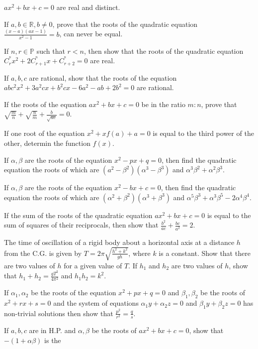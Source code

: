   $ax^2 + bx + c = 0$ are real and distinct.
\item If $a, b\in\mathbb{R}, b\neq 0$, prove that the roots of the quadratic equation $\frac{(x - a)(ax - 1)}{x^2 - 1} = b$, can
  never be equal.
\item If $n, r\in\mathbb{P}$ such that $r < n$, then show that the roots of the quadratic equation $C_r^^nx^2 + 2C_{r + 1}^^nx +
  C_{r + 2}^^n = 0$ are real.
\item If $a, b, c$ are rational, show that the roots of the equation $abc^2x^2 + 3a^2cx + b^2cx - 6a^2 - ab + 2b^2 = 0$ are
  rational.
\item If the roots of the equation $ax^2 + bx + c = 0$ be in the ratio $m:n$, prove that $\sqrt{\frac{m}{n}} + \sqrt{\frac{n}{m}} +
  \frac{b}{\sqrt{ac}} = 0$.
\item If one root of the equation $x^2 + xf(a) + a = 0$ is equal to the third power of the other, determin the function $f(x)$.
\item If $\alpha, \beta$ are the roots of the equation $x^2 - px + q = 0$, then find the quadratic equation the roots of which are
  $(a^2 - \beta^2)(\alpha^3 - \beta^3)$ and $\alpha^3\beta^2 + \alpha^2\beta^3$.
\item If $\alpha, \beta$ are the roots of the equation $x^2 - bx + c = 0$, then find the quadratic equation the roots of which are
  $(\alpha^2 + \beta^2)(\alpha^3 + \beta^3)$ and $\alpha^5\beta^3 + \alpha^3\beta^5 - 2\alpha^4\beta^4$.
\item If the sum of the roots of the quadratic equation $ax^2 + bx + c = 0$ is equal to the sum of squares of their reciprocals,
  then show that $\frac{b^2}{ac} + \frac{bc}{a^2} = 2$.
\item The time of oscillation of a rigid body about a horizontal axis at a distance $h$ from the C.G. is given by $T = 2\pi
  \sqrt{\frac{h^2 + k^2}{gh}}$, where $k$ is a constant. Show that there are two values of $h$ for a given value of $T$. If $h_1$
  and $h_2$ are two values of $h$, show that $h_1 + h_2 = \frac{gT^2}{4\pi^2}$ and $h_1h_2 = k^2$.
\item If $\alpha_1, \alpha_2$ be the roots of the equation $x^2 + px + q = 0$ and $\beta_1, \beta_2$ be the roots of $x^2 + rx + s=
  0$ and the system of equations $\alpha_1y + \alpha_2z = 0$ and $\beta_1y + \beta_2z = 0$ has non-trivial solutions then show that
  $\frac{p^2}{r^2} = \frac{q}{s}$.
\item  If $a, b, c$ are in H.P. and $\alpha, \beta$ be the roots of $ax^2 + bx + c = 0$, show that $-(1 + \alpha\beta)$ is the
